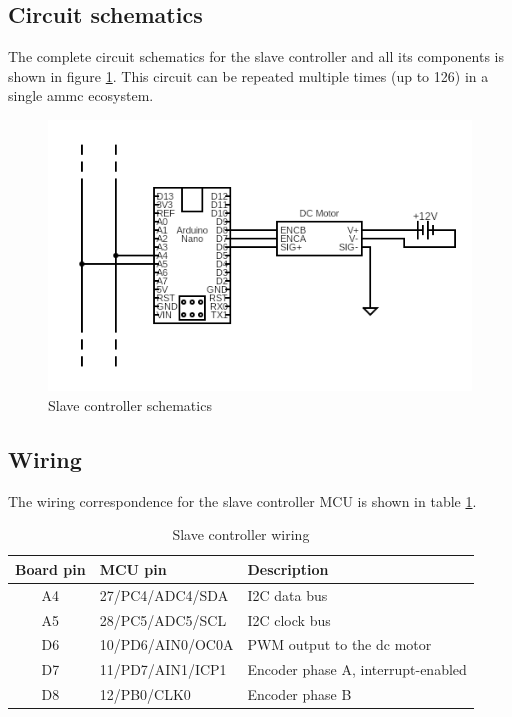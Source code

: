 \documentclass[binding=0.6cm,Lau]{sapthesis}
\begin{document}
\subsection{Circuit schematics}
The complete circuit schematics for the slave controller and all its components
is shown in figure \ref{img:slave-sch}. This circuit can be repeated multiple
times (up to 126) in a single ammc ecosystem.
\begin{figure}[hbp]
\begin{centering}
  \includegraphics[scale=0.7]{img/slave-schematics}
  \caption{Slave controller schematics}
  \label{img:slave-sch}
\end{centering}
\end{figure}

\subsection{Wiring}
The wiring correspondence for the slave controller MCU is shown in table
\ref{tab:slave-wiring}.
\begin{table}[hb]
  \begin{tabularx}{\textwidth}{c l X}
    \toprule
    Board pin & MCU pin & Description \\
    \midrule
    A4 & 27/PC4/ADC4/SDA  & I2C data bus \\
    A5 & 28/PC5/ADC5/SCL  & I2C clock bus \\
    D6 & 10/PD6/AIN0/OC0A & PWM output to the dc motor \\
    D7 & 11/PD7/AIN1/ICP1 & Encoder phase A, interrupt-enabled \\
    D8 & 12/PB0/CLK0      & Encoder phase B \\
    \bottomrule
  \end{tabularx}
  \caption{Slave controller wiring}
  \label{tab:slave-wiring}
\end{table}
\end{document}
